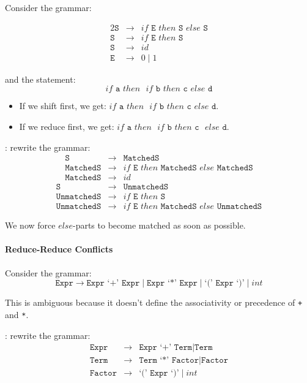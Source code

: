 \documentclass[twocolumn,english]{article}
\let\emph\relax
\begin{document}
Consider the grammar:

\begin{alignat*}{2}
\texttt{S} & \rightarrow & if\texttt{ E }then\texttt{ S }else\texttt{ S}\\
\texttt{S} & \rightarrow & if\texttt{ E }then\texttt{ S}\\
\texttt{S} & \rightarrow & id\\
\texttt{E} & \rightarrow & 0\mid1
\end{alignat*}

and the statement:
\[
if\texttt{ a }then\texttt{ }if\texttt{ b }then\texttt{ c }else\texttt{ d}
\]
\begin{itemize}
\item If we shift first, we get: $if\texttt{ a }then\texttt{ }\boxed{if\texttt{ b }then\texttt{ c }else\texttt{ d}}$.
\item If we reduce first, we get: $if\texttt{ a }then\texttt{ }\boxed{if\texttt{ b }then\texttt{ c}}\texttt{ }else\texttt{ d}$.
\end{itemize}
\emph{Solution}: rewrite the grammar:
\begin{align*}
\texttt{S} & \rightarrow & \texttt{MatchedS}\\
\texttt{MatchedS} & \rightarrow & if\texttt{ E }then\texttt{ MatchedS }else\texttt{ MatchedS}\\
\texttt{MatchedS} & \rightarrow & id
\end{align*}
\begin{align*}
\texttt{S} & \rightarrow & \texttt{UnmatchedS}\\
\texttt{UnmatchedS} & \rightarrow & if\texttt{ E }then\texttt{ S}\\
\texttt{UnmatchedS} & \rightarrow & if\texttt{ E }then\texttt{ MatchedS }else\texttt{ UnmatchedS}
\end{align*}

We now force $else$-parts to become matched as soon as possible.

\paragraph{Reduce-Reduce Conflicts}

Consider the grammar:
\[
\texttt{Expr}\rightarrow\texttt{Expr `+' Expr}\mid\texttt{Expr `*' Expr}\mid\texttt{`(' Expr `)'}\mid int
\]

This is ambiguous because it doesn't define the associativity or precedence
of \texttt{+} and \texttt{{*}}.

\emph{Solution}: rewrite the grammar:
\begin{align*}
\texttt{Expr} & \rightarrow & \texttt{Expr `+' Term}\mid\texttt{Term}\\
\texttt{Term} & \rightarrow & \texttt{Term `*' Factor}\mid\texttt{Factor}\\
\texttt{Factor} & \rightarrow & \texttt{`(' Expr `)'}\mid int
\end{align*}
\end{document}

